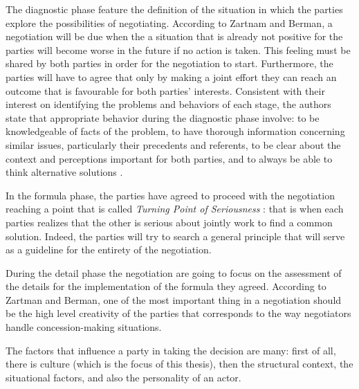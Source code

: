 \documentclass[../main.tex]{subfiles}
\begin{document}
The diagnostic phase feature the definition of the situation in which the parties explore the possibilities of negotiating. According to Zartnam and Berman, a negotiation will be due when the a situation that is already not positive for the parties will become worse in the future if no action is taken. This feeling must be shared by both parties in order for the negotiation to start. Furthermore, the parties will have to agree that only by making a joint effort they can reach an outcome that is favourable for both parties' interests. Consistent with their interest on identifying the problems and behaviors of each stage, the authors state that appropriate behavior during the diagnostic phase involve: to be knowledgeable of facts of the problem, to have thorough information concerning similar issues, particularly their precedents and referents, to be clear about the context and perceptions important for both parties, and to always be able to think alternative solutions \cite{iragorri}.

In the formula phase, the parties have agreed to proceed with the negotiation reaching a point that is called \textit{Turning Point of Seriousness} \autocite[3]{zartman1982practical}: that is when each parties realizes that the other is serious about jointly work to find a common solution. Indeed, the parties will try to search a general principle that will serve as a guideline for the entirety of the negotiation.

During the detail phase the negotiation are going to focus on the assessment of the details for the implementation of the formula they agreed. According to Zartman and Berman, one of the most important thing in a negotiation should be the high level creativity of the parties that corresponds to  the way negotiators handle concession-making situations.

The factors that influence a party in taking the decision are many: first of all, there is culture (which is the focus of this thesis), then the structural context, the situational factors, and also the personality of an actor. \cite{acemoglu2000}
\pagebreak 
\end{document}

